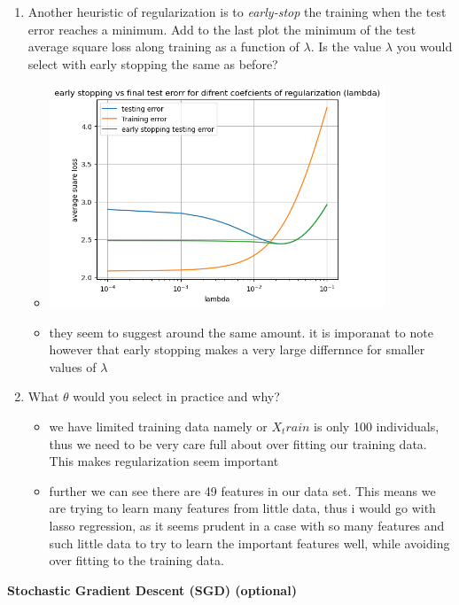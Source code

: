 \documentclass{article}
\newcommand{\nyuparagrah}[1]{\textcolor{nyupurple}{\large #1}}
\begin{document}
\begin{enumerate}
\item Another heuristic of regularization is to \emph{early-stop} the training when the test error reaches a minimum. Add to the last plot the minimum of the test average square loss along training as a function of $\lambda$.
Is the value $\lambda$ you would select with early stopping the same as before? 
\begin{itemize}
    \item\includegraphics[width=10cm]{homework/homework_2/immages/19_1.png}
    \item they seem to suggest around the same amount. it is imporanat to note however that early stopping makes a very large differnnce for smaller values of $\lambda$
\end{itemize}

\item What $\theta$ would you select in practice and why?
\setcounter{saveenum}{\value{enumi}}
\begin{itemize}
    \item we have limited training data namely or $X_train$ is only 100 individuals, thus we need to be very care full about over fitting our training data. This makes regularization seem important 
    \item further we can see there are 49 features in our data set. This means we are trying to learn many features from little data, thus i would go with lasso regression, as it seems prudent in a case with so many features and such little data to try to learn the important features well, while avoiding over fitting to the training data. 
\end{itemize}


\end{enumerate}

\vspace{0.3cm}
\nyuparagrah{\bf Stochastic Gradient Descent (SGD) (optional)}
\end{document}
